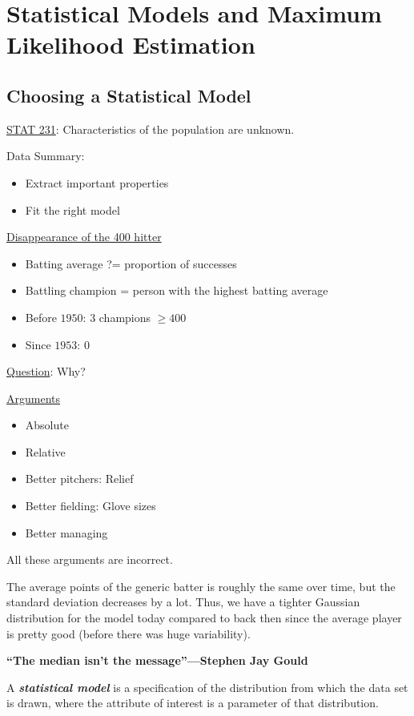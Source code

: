 \chapter{Statistical Models and Maximum Likelihood Estimation}

\section{Choosing a Statistical Model}

\underline{STAT 231}: Characteristics of the population
are unknown.

Data Summary:
\begin{itemize}
    \item Extract important properties
    \item Fit the right model
\end{itemize}

\underline{Disappearance of the 400 hitter}
\begin{itemize}
    \item Batting average ?= proportion of successes
    \item Battling champion = person with the highest batting average
    \item Before $ 1950 $: 3 champions $ \geqslant 400 $
    \item Since $ 1953 $: 0
\end{itemize}
\underline{Question}: Why?

\underline{Arguments}
\begin{itemize}
    \item Absolute
    \item Relative
    \item Better pitchers: Relief
    \item Better fielding: Glove sizes
    \item Better managing
\end{itemize}
All these arguments are incorrect.

The average points of the generic batter is roughly the same over time,
but the standard deviation decreases by a lot. Thus, we have a tighter Gaussian
distribution for the model today compared to back then since the average
player is pretty good (before there was huge variability).

\textbf{``The median isn't the message''---Stephen Jay Gould}

\begin{defbox}
    \begin{definition}
        A \textbf{\emph{statistical model}} is a specification of the
        distribution from which the data set is drawn, where the attribute of interest
        is a parameter of that distribution.
    \end{definition}
\end{defbox}

